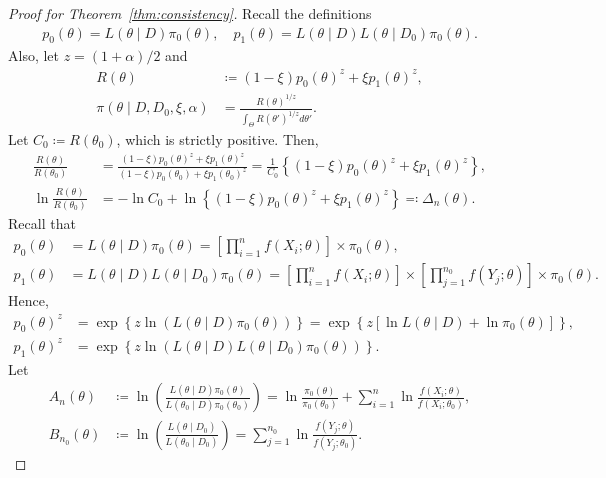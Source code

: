 \documentclass[12pt]{article}
\begin{document}
\begin{proof}[Proof for Theorem~\ref{thm:consistency}]
    Recall the definitions
    \begin{align*}
        p_0(\theta) = L(\theta \mid D)\pi_0(\theta), \quad p_1(\theta) = L(\theta \mid D)L(\theta \mid D_0)\pi_0(\theta).
    \end{align*}
    Also, let $z = (1 + \alpha) / 2$ and
    \begin{align*}
        R(\theta) &\coloneqq (1 - \xi)p_0(\theta)^z + \xi p_1(\theta)^z, \\
        \pi(\theta \mid D, D_0, \xi, \alpha) &= \frac{R(\theta)^{1/z}}{\int_\Theta R(\theta')^{1/z}d\theta'}.
    \end{align*}
    Let $C_0 \coloneqq R(\theta_0)$, which is strictly positive.
    Then,
    \begin{align*}
        \frac{R(\theta)}{R(\theta_0)} &= \frac{(1 - \xi)p_0(\theta)^z + \xi p_1(\theta)^z}{(1 - \xi)p_0(\theta_0) + \xi p_1(\theta_0)^z} = \frac{1}{C_0}\left\{(1 - \xi)p_0(\theta)^z + \xi p_1(\theta)^z\right\}, \\
        \ln \frac{R(\theta)}{R(\theta_0)} &= -\ln C_0 + \ln \left\{(1 - \xi)p_0(\theta)^z + \xi p_1(\theta)^z\right\} \eqqcolon \Delta_n(\theta).
    \end{align*}
    Recall that
    \begin{align*}
        p_0(\theta) &= L(\theta \mid D)\pi_0(\theta) = \left[\prod^n_{i=1}f(X_i ; \theta)\right]\times \pi_0(\theta), \\
        p_1(\theta) &= L(\theta \mid D)L(\theta \mid D_0)\pi_0(\theta) = \left[\prod^n_{i=1}f(X_i ; \theta)\right] \times \left[\prod^{n_0}_{j=1}f(Y_j; \theta)\right]\times \pi_0(\theta).
    \end{align*}
    Hence,
    \begin{align*}
        p_0(\theta)^z &= \exp\left\{z \ln (L(\theta \mid D)\pi_0(\theta))\right\} = \exp\left\{z\left[\ln L(\theta \mid D) + \ln \pi_0(\theta)\right]\right\}, \\
        p_1(\theta)^z &= \exp\left\{z \ln (L(\theta \mid D)L(\theta \mid D_0)\pi_0(\theta))\right\}.
    \end{align*}
    Let
    \begin{align*}
        A_n(\theta) &\coloneqq \ln\left(\frac{L(\theta \mid D)\pi_0(\theta)}{L(\theta_0 \mid D)\pi_0(\theta_0)}\right) = \ln\frac{\pi_0(\theta)}{\pi_0(\theta_0)} + \sum^n_{i=1}\ln\frac{f(X_i; \theta)}{f(X_i; \theta_0)}, \\
        B_{n_0}(\theta) &\coloneqq \ln\left(\frac{L(\theta \mid D_0)}{L(\theta_0 \mid D_0)}\right) = \sum^{n_0}_{j=1}\ln\frac{f(Y_j; \theta)}{f(Y_j; \theta_0)}.

\end{align*}
\end{proof}
\end{document}
